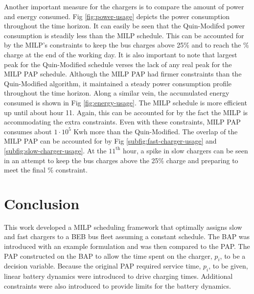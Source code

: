 \documentclass[utf8]{FrontiersinHarvard}
\newcommand{\bcharge}{0.7 }                                                     %
\newcommand{\mincharge}{25\% }                                                  %
\begin{document}
Another important measure for the chargers is to compare the amount of power and energy consumed. Fig
\ref{fig:power-usage} depicts the power consumption throughout the time horizon. It can easily be seen that the
Quin-Modifed power consumption is steadily less than the MILP schedule. This can be accounted for by the MILP's
constraints to keep the bus charges above \mincharge and to reach the \fpeval{\bcharge *100}\% charge at the end of the
working day. It is also important to note that largest peak for the Quin-Modified schedule verses the lack of any real
peak for the MILP PAP schedule. Although the MILP PAP had firmer constraints than the Quin-Modified algorithm, it
maintained a steady power consumption profile throughout the time horizon. Along a similar vein, the accumulated energy
consumed is shown in Fig \ref{fig:energy-usage}. The MILP schedule is more efficient up until about hour 11. Again, this
can be accounted for by the fact the MILP is accommodating the extra constraints. Even with these constraints, MILP PAP
consumes about $1\cdot10^5$ Kwh more than the Quin-Modified. The overlap of the MILP PAP can be accounted for by Fig
\ref{subfig:fast-charger-usage} and \ref{subfig:slow-charger-usage}. At the $\text{11}^{\text{th}}$ hour, a spike in
slow chargers can be seen in an attempt to keep the bus charges above the \mincharge charge and preparing to meet the
final \fpeval{\bcharge * 100}\% constraint.

\section{Conclusion}
\label{sec:conclusion}

This work developed a MILP scheduling framework that optimally assigns slow and fast chargers to a BEB bus fleet
assuming a constant schedule. The BAP was introduced with an example formulation and was then compared to the PAP. The
PAP constructed on the BAP to allow the time spent on the charger, $p_i$, to be a decision variable. Because the
original PAP required service time, $p_i$, to be given, linear battery dynamics were introduced to drive charging times.
Additional constraints were also introduced to provide limits for the battery dynamics.
\end{document}
